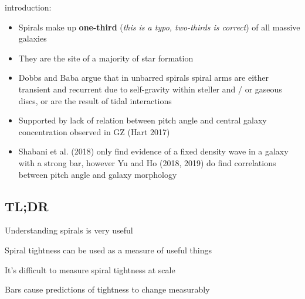 \citet{2019arXiv190910291P} introduction:

\begin{itemize}
  \item Spirals make up \textbf{one-third} (\textit{this is a typo, two-thirds is correct}) of all massive galaxies
  \item They are the site of a majority of star formation
  \item Dobbs and Baba argue that in unbarred spirals spiral arms are either transient and recurrent due to self-gravity within steller and / or gaseous discs, or are the result of tidal interactions
  \item Supported by lack of relation between pitch angle and central galaxy concentration observed in GZ (Hart 2017)
  \item Shabani et al. (2018) only find evidence of a fixed density wave in a galaxy with a strong bar, however Yu and Ho (2018, 2019) do find correlations between pitch angle and galaxy morphology
\end{itemize}

\subsection*{TL;DR}

Understanding spirals is very useful

Spiral tightness can be used as a measure of useful things

It's difficult to measure spiral tightness at scale

Bars cause predictions of tightness to change measurably
